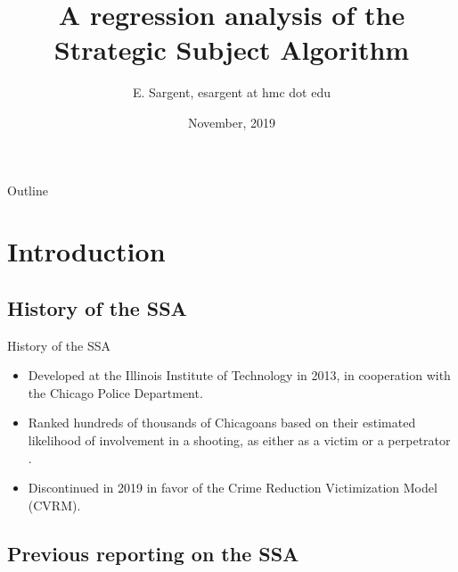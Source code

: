 \documentclass{beamer}
\title[Strategic Subject Algorithm]{A regression analysis of the Strategic Subject Algorithm}
\author{E. Sargent, esargent at hmc dot edu}
\date{November, 2019}
\begin{document}
\begin{frame}
  \titlepage
\end{frame}

\begin{frame}{Outline}
  \tableofcontents
\end{frame}

\section{Introduction}

\subsection{History of the SSA}

\begin{frame}{History of the SSA}
  \begin{itemize}
  \item {
    Developed at the Illinois Institute of Technology in 2013, in cooperation with the Chicago Police Department.
  }
  \item {
   Ranked hundreds of thousands of Chicagoans based on their estimated likelihood of involvement in a shooting, as either as a victim or a perpetrator \cite{nyt}.
  }
  \item {
    Discontinued in 2019 in favor of the Crime Reduction Victimization Model (CVRM).
  }
  \end{itemize}
\end{frame}

\subsection{Previous reporting on the SSA}
\end{document}
